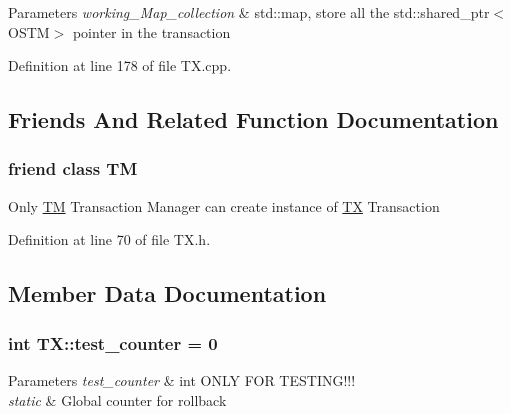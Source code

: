 \begin{DoxyParams}{Parameters}
{\em working\+\_\+\+Map\+\_\+collection} & std\+::map, store all the std\+::shared\+\_\+ptr$<$\+O\+S\+T\+M$>$ pointer in the transaction \\
\hline
\end{DoxyParams}


Definition at line 178 of file T\+X.\+cpp.



\subsection{Friends And Related Function Documentation}
\subsubsection[{\texorpdfstring{TM}{TM}}]{\setlength{\rightskip}{0pt plus 5cm}friend class {\bf TM}\hspace{0.3cm}{\ttfamily [friend]}}\hypertarget{class_t_x_adf1ccda799ef5c419cb43b8ae55eb45c}{}\label{class_t_x_adf1ccda799ef5c419cb43b8ae55eb45c}
Only \hyperlink{class_t_m}{TM} Transaction Manager can create instance of \hyperlink{class_t_x}{TX} Transaction 

Definition at line 70 of file T\+X.\+h.



\subsection{Member Data Documentation}
\subsubsection[{\texorpdfstring{test\+\_\+counter}{test_counter}}]{\setlength{\rightskip}{0pt plus 5cm}int T\+X\+::test\+\_\+counter = 0\hspace{0.3cm}{\ttfamily [static]}}\hypertarget{class_t_x_a25838234aab99ae891a90eb8623a8b3c}{}\label{class_t_x_a25838234aab99ae891a90eb8623a8b3c}

\begin{DoxyParams}{Parameters}
{\em test\+\_\+counter} & int O\+N\+LY F\+OR T\+E\+S\+T\+I\+N\+G!!!\\
\hline
{\em static} & Global counter for rollback \\
\hline
\end{DoxyParams}


